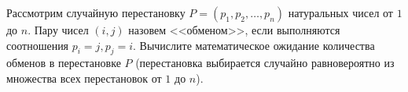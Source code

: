 \documentclass{article}
\begin{document}
Рассмотрим случайную перестановку $P = (p_1,p_2,\ldots,p_n)$ натуральных чисел от $1$ до $n$. Пару чисел $(i,j)$ назовем <<обменом>>, 
если выполняются соотношения $p_i=j, p_j=i$. Вычислите математическое ожидание количества обменов в перестановке $P$ (перестановка выбирается случайно равновероятно из множества всех перестановок 
от $1$ до $n$).
\end{document}
